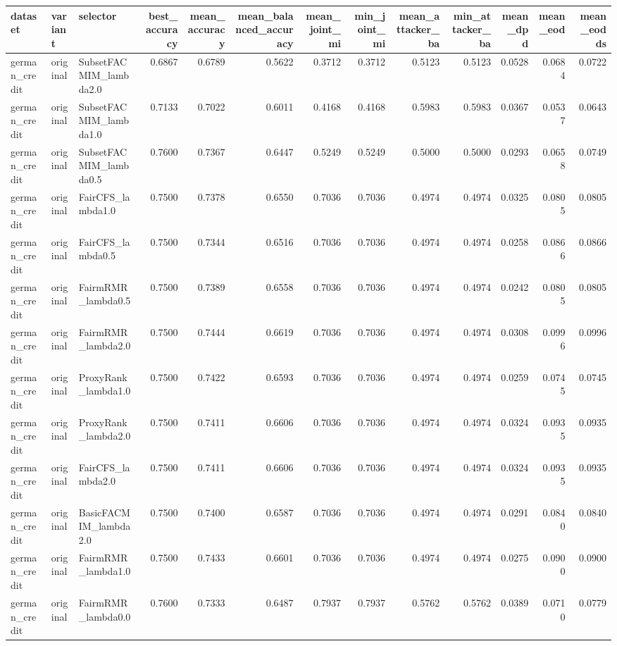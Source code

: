 \begin{tabular}{lllrrrrrrrrrr}
\toprule
dataset & variant & selector & best_accuracy & mean_accuracy & mean_balanced_accuracy & mean_joint_mi & min_joint_mi & mean_attacker_ba & min_attacker_ba & mean_dpd & mean_eod & mean_eodds \\
\midrule
german_credit & original & SubsetFACMIM_lambda2.0 & 0.6867 & 0.6789 & 0.5622 & 0.3712 & 0.3712 & 0.5123 & 0.5123 & 0.0528 & 0.0684 & 0.0722 \\
german_credit & original & SubsetFACMIM_lambda1.0 & 0.7133 & 0.7022 & 0.6011 & 0.4168 & 0.4168 & 0.5983 & 0.5983 & 0.0367 & 0.0537 & 0.0643 \\
german_credit & original & SubsetFACMIM_lambda0.5 & 0.7600 & 0.7367 & 0.6447 & 0.5249 & 0.5249 & 0.5000 & 0.5000 & 0.0293 & 0.0658 & 0.0749 \\
german_credit & original & FairCFS_lambda1.0 & 0.7500 & 0.7378 & 0.6550 & 0.7036 & 0.7036 & 0.4974 & 0.4974 & 0.0325 & 0.0805 & 0.0805 \\
german_credit & original & FairCFS_lambda0.5 & 0.7500 & 0.7344 & 0.6516 & 0.7036 & 0.7036 & 0.4974 & 0.4974 & 0.0258 & 0.0866 & 0.0866 \\
german_credit & original & FairmRMR_lambda0.5 & 0.7500 & 0.7389 & 0.6558 & 0.7036 & 0.7036 & 0.4974 & 0.4974 & 0.0242 & 0.0805 & 0.0805 \\
german_credit & original & FairmRMR_lambda2.0 & 0.7500 & 0.7444 & 0.6619 & 0.7036 & 0.7036 & 0.4974 & 0.4974 & 0.0308 & 0.0996 & 0.0996 \\
german_credit & original & ProxyRank_lambda1.0 & 0.7500 & 0.7422 & 0.6593 & 0.7036 & 0.7036 & 0.4974 & 0.4974 & 0.0259 & 0.0745 & 0.0745 \\
german_credit & original & ProxyRank_lambda2.0 & 0.7500 & 0.7411 & 0.6606 & 0.7036 & 0.7036 & 0.4974 & 0.4974 & 0.0324 & 0.0935 & 0.0935 \\
german_credit & original & FairCFS_lambda2.0 & 0.7500 & 0.7411 & 0.6606 & 0.7036 & 0.7036 & 0.4974 & 0.4974 & 0.0324 & 0.0935 & 0.0935 \\
german_credit & original & BasicFACMIM_lambda2.0 & 0.7500 & 0.7400 & 0.6587 & 0.7036 & 0.7036 & 0.4974 & 0.4974 & 0.0291 & 0.0840 & 0.0840 \\
german_credit & original & FairmRMR_lambda1.0 & 0.7500 & 0.7433 & 0.6601 & 0.7036 & 0.7036 & 0.4974 & 0.4974 & 0.0275 & 0.0900 & 0.0900 \\
german_credit & original & FairmRMR_lambda0.0 & 0.7600 & 0.7333 & 0.6487 & 0.7937 & 0.7937 & 0.5762 & 0.5762 & 0.0389 & 0.0710 & 0.0779 \\

\end{tabular}
